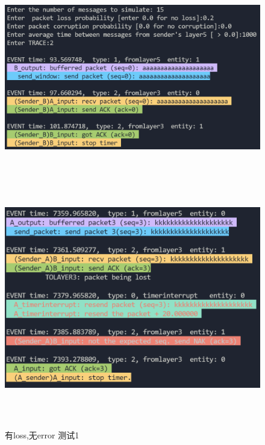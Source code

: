 \documentclass[UTF8,14pt]{article}
\numberwithin{figure}{section}
\begin{document}
\newpage
\begin{figure}[!htbp]
      \centering
      \setlength{\abovecaptionskip}{0.cm}
      \includegraphics[width=15cm,height=8.48cm]{gbn1_1.png}
      \includegraphics[width=15cm,height=10.62cm]{gbn1_2.png}
      \caption{有loss,无error 测试1}
\end{figure}
\end{document}
